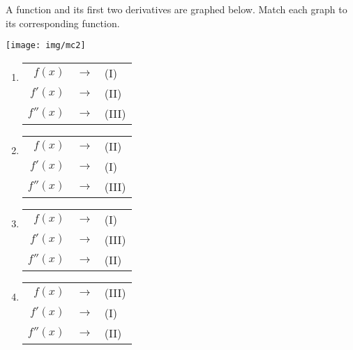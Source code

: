 \item A function and its first two derivatives are graphed below. Match each graph to its corresponding function.

\begin{center}
	\texttt{[image: img/mc2]}
\end{center}


\begin{multicols}{2}
\begin{enumerate}\setlength{\itemsep}{.5cm}
\item \begin{minipage}{.45\textwidth}
	\begin{tabular}{rcl}
		$f(x)$ & $\longrightarrow$ & (I) \\
		$f'(x)$ & $\longrightarrow$ & (II) \\
		$f''(x)$ & $\longrightarrow$ & (III) \\
	\end{tabular}
\end{minipage}

\item \begin{minipage}{.45\textwidth}
	\begin{tabular}{rcl}
		$f(x)$ & $\longrightarrow$ & (II) \\
		$f'(x)$ & $\longrightarrow$ & (I) \\
		$f''(x)$ & $\longrightarrow$ & (III) \\
	\end{tabular}
\end{minipage}

\item \begin{minipage}{.45\textwidth}
	\begin{tabular}{rcl}
		$f(x)$ & $\longrightarrow$ & (I) \\
		$f'(x)$ & $\longrightarrow$ & (III) \\
		$f''(x)$ & $\longrightarrow$ & (II) \\
	\end{tabular}
\end{minipage} %

\item \begin{minipage}{.45\textwidth}
	\begin{tabular}{rcl}
		$f(x)$ & $\longrightarrow$ & (III) \\
		$f'(x)$ & $\longrightarrow$ & (I) \\
		$f''(x)$ & $\longrightarrow$ & (II) \\
	\end{tabular}
\end{minipage}


\end{enumerate}
\end{multicols}
